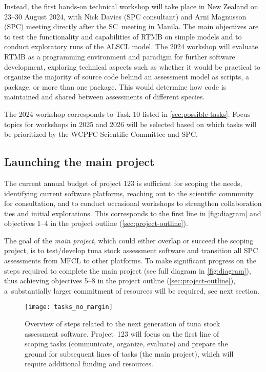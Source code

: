 \documentclass{SCreport}
\begin{document}
Instead, the first hands-on technical workshop will take place in New Zealand on
23--30 August 2024, with Nick Davies (SPC consultant) and Arni Magnusson (SPC)
meeting directly after the SC~meeting in Manila. The main objectives are to test
the functionality and capabilities of RTMB on simple models and to conduct
exploratory runs of the ALSCL model. The 2024 workshop will evaluate RTMB as a
programming environment and paradigm for further software development, exploring
technical aspects such as whether it would be practical to organize the majority
of source code behind an assessment model as scripts, a package, or more than
one package. This would determine how code is maintained and shared between
assessments of different species.

The 2024 workshop corresponds to Task 10 listed in \autoref{sec:possible-tasks}.
Focus topics for workshops in 2025 and 2026 will be selected based on which
tasks will be prioritized by the WCPFC Scientific Committee and SPC.

\subsection{Launching the main project}

The current annual budget of project 123 is sufficient for scoping the needs,
identifying current software platforms, reaching out to the scientific community
for consultation, and to conduct occasional workshops to strengthen
collaboration ties and initial explorations. This corresponds to the first line
in \autoref{fig:diagram} and objectives 1--4 in the project outline
(\autoref{sec:project-outline}).

The goal of the \emph{main project}, which could either overlap or succeed the
scoping project, is to test/develop tuna stock assessment software and
transition all SPC assessments from MFCL to other platforms. To make significant
progress on the steps required to complete the main project (see full diagram in
\autoref{fig:diagram}), thus achieving objectives 5--8 in the project outline
(\autoref{sec:project-outline}), a~substantially larger commitment of resources
will be required, see next section.

\begin{figure}[H]
  \centering
  \texttt{[image: tasks\_no\_margin]}
  \caption{Overview of steps related to the next generation of tuna stock
    assessment software. Project~123 will focus on the first line of scoping
    tasks (communicate, organize, evaluate) and prepare the ground for
    subsequent lines of tasks (the main project), which will require additional
    funding and resources.}\label{fig:diagram}
\end{figure}
\end{document}
